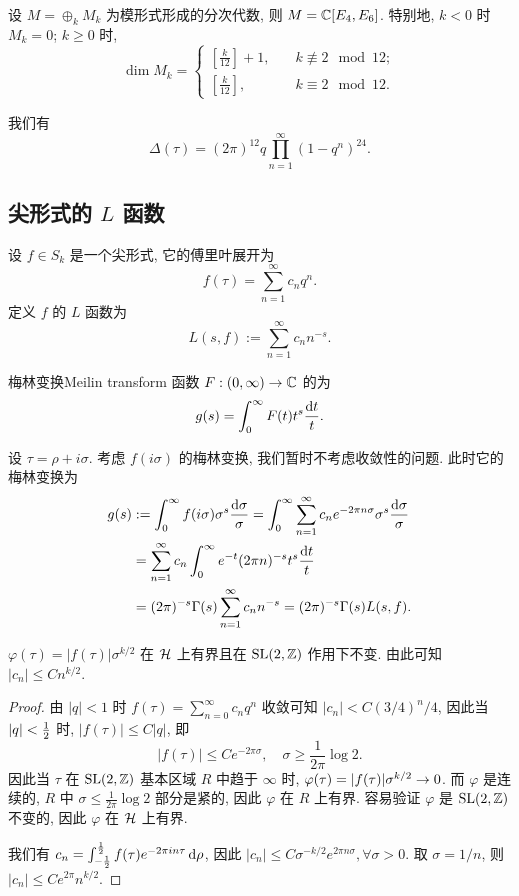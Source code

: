 \begin{theorem}{}{}
设 $M=\oplus_{k} M_k$ 为模形式形成的分次代数, 则 $M={\mathbb{C}}[E_4,E_6]$. 特别地, $k<0$ 时 $M_k=0$; $k\ge 0$ 时,
  \[\dim M_k=\begin{cases}
\left[\frac{k}{12}\right]+1,\quad & k\not\equiv 2\mod 12;\\
\left[\frac{k}{12}\right],\quad & k\equiv2\mod 12.
\end{cases}\]
\end{theorem}

\begin{proposition}{}{}
我们有
  \[\Delta(\tau)=(2\pi)^{12}q\prod_{n=1}^\infty(1-q^n)^{24}.\]
\end{proposition}

\subsection{尖形式的 \texorpdfstring{$L$}{L} 函数}
设 $f\in S_k$ 是一个尖形式, 它的傅里叶展开为
  \[f(\tau)=\sum_{n=1}^\infty c_nq^n.\]
定义 $f$ 的 $L$ 函数为
  \[L(s,f):=\sum_{n=1}^\infty c_nn^{-s}.\]

\begin{definition}{梅林变换}{Meilin transform}
函数 $F:(0,\infty)\to {\mathbb{C}}$ 的为
  \[g(s)=\int_0^\infty F(t)t^s\frac{\mathop{}\!\mathrm{d} t}t.\]
\end{definition}

设 $\tau=\rho+i\sigma$.
考虑 $f(i\sigma)$ 的梅林变换, 我们暂时不考虑收敛性的问题. 此时它的梅林变换为
  \[\begin{split}
g(s)&:=\int_0^\infty f(i\sigma)\sigma^s \frac{\mathop{}\!\mathrm{d} \sigma}{\sigma}=\int_0^\infty \sum_{n=1}^\infty c_n e^{-2\pi n \sigma}\sigma^s\frac{\mathop{}\!\mathrm{d} \sigma}\sigma\\
&=\sum_{n=1}^\infty c_n\int_0^\infty e^{-t}(2\pi n)^{-s}t^s\frac{\mathop{}\!\mathrm{d} t}t\\
&=(2\pi)^{-s}\Gamma(s)\sum_{n=1}^\infty c_nn^{-s}=(2\pi)^{-s}\Gamma(s)L(s,f).
\end{split}\]

\begin{lemma}{}{}
$\varphi(\tau)=|f(\tau)|\sigma^{k/2}$ 在 ${\mathcal{H}}$ 上有界且在 ${\mathrm{SL}}(2,{\mathbb{Z}})$ 作用下不变. 由此可知 $|c_n|\le Cn^{k/2}$.
\end{lemma}
\begin{proof}
由 $|q|<1$ 时 $f(\tau)=\sum_{n=0}^\infty c_n q^n$ 收敛可知 $|c_n|<C(3/4)^n/4$, 因此当 $|q|<\frac{1}{2}$ 时, $|f(\tau)|\le C|q|$, 即
  \[|f(\tau)|\le Ce^{-2\pi\sigma},\quad \sigma\ge \frac{1}{2\pi}\log 2.\]
因此当 $\tau$ 在 ${\mathrm{SL}}(2,{\mathbb{Z}})$ 基本区域 $R$ 中趋于 $\infty$ 时, $\varphi(\tau)=|f(\tau)|\sigma^{k/2}\rightarrow 0$. 而 $\varphi$ 是连续的, $R$ 中 $\sigma\le \frac{1}{2\pi}\log2$ 部分是紧的, 因此 $\varphi$ 在 $R$ 上有界. 容易验证 $\varphi$ 是 ${\mathrm{SL}}(2,{\mathbb{Z}})$ 不变的, 因此 $\varphi$ 在 ${\mathcal{H}}$ 上有界.

我们有 $c_n=\int_{-\frac{1}{2}}^{\frac{1}{2}} f(\tau)e^{-2\pi i n\tau}\mathop{}\!\mathrm{d} \rho$, 因此 $|c_n|\le C\sigma^{-k/2} e^{2\pi n \sigma},\forall \sigma>0$. 取 $\sigma=1/n$, 则 $|c_n|\le Ce^{2\pi}n^{k/2}$.
\end{proof}

